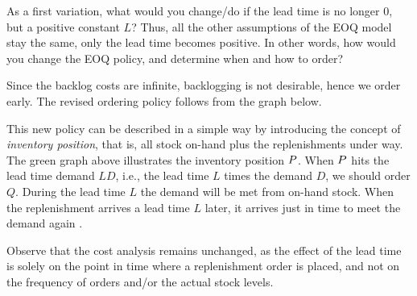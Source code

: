 \begin{exercise}\label{ex:7}
  As a first variation, what would you change/do if the lead time
  is no longer 0, but a positive constant  $L$? Thus, all the other
  assumptions of the EOQ model stay the same, only the lead time
  becomes positive.  In other words, how would you change the EOQ
  policy, and determine when and how to order?

  \begin{solution}
    Since the backlog costs are infinite, backlogging is not
    desirable, hence we order early. The revised ordering policy follows from the graph below.
\begin{center}
\end{center}
    
This new policy can be described in a simple way by introducing the
concept of \emph{inventory position}, that is, all stock on-hand plus
the replenishments under way. The green graph above illustrates the
inventory position $P$. When $P$ hits the lead time demand $L D$,
i.e., the lead time $L$ times the demand $D$, we should order
$Q$. During the lead time $L$ the demand will be met from on-hand
stock. When the replenishment arrives a lead time $L$ later, it
arrives just in time to meet the demand again .

Observe that the cost analysis remains unchanged, as the effect of the lead time is solely on the point in time where a replenishment order is placed, and not on the frequency of orders and/or the actual stock levels. 

  \end{solution}
\end{exercise}

